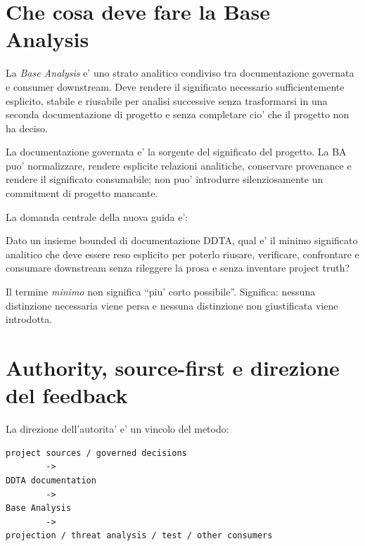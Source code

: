 \documentclass[11pt,a4paper]{article}
\newcommand{\BA}{\textit{Base Analysis}}
\begin{document}
\section{Che cosa deve fare la Base Analysis}

La \BA{} e' uno strato analitico condiviso tra documentazione governata e consumer downstream. Deve rendere il significato necessario sufficientemente esplicito, stabile e riusabile per analisi successive senza trasformarsi in una seconda documentazione di progetto e senza completare cio' che il progetto non ha deciso.

\begin{ddtaprinciple}[title={Project truth rimane nella documentazione}]
La documentazione governata e' la sorgente del significato del progetto. La BA puo' normalizzare, rendere esplicite relazioni analitiche, conservare provenance e rendere il significato consumabile; non puo' introdurre silenziosamente un commitment di progetto mancante.
\end{ddtaprinciple}

La domanda centrale della nuova guida e':

\begin{ddtacheck}[title={Domanda centrale}]
Dato un insieme bounded di documentazione DDTA, qual e' il minimo significato analitico che deve essere reso esplicito per poterlo riusare, verificare, confrontare e consumare downstream senza rileggere la prosa e senza inventare project truth?
\end{ddtacheck}

Il termine \emph{minimo} non significa ``piu' corto possibile''. Significa: nessuna distinzione necessaria viene persa e nessuna distinzione non giustificata viene introdotta.

\section{Authority, source-first e direzione del feedback}

La direzione dell'autorita' e' un vincolo del metodo:

\begin{lstlisting}
project sources / governed decisions
        ->
DDTA documentation
        ->
Base Analysis
        ->
projection / threat analysis / test / other consumers
\end{lstlisting}
\end{document}
